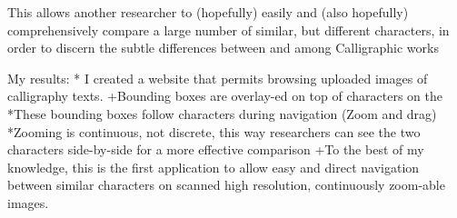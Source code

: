                 This allows another researcher to (hopefully) easily and (also hopefully) comprehensively compare a large number of similar, but different characters, in order to discern the subtle differences between and among Calligraphic works
                
                
                    My results:
        *  I created a website that permits browsing uploaded images of calligraphy texts.
            +Bounding boxes are overlay-ed on top of characters on the 
                *These bounding boxes follow characters during navigation (Zoom and drag)
                *Zooming is continuous, not discrete, this way researchers can see the two characters side-by-side for a more effective comparison
            +To the best of my knowledge, this is the first application to allow easy and direct navigation between similar characters on scanned high resolution, continuously zoom-able images.
